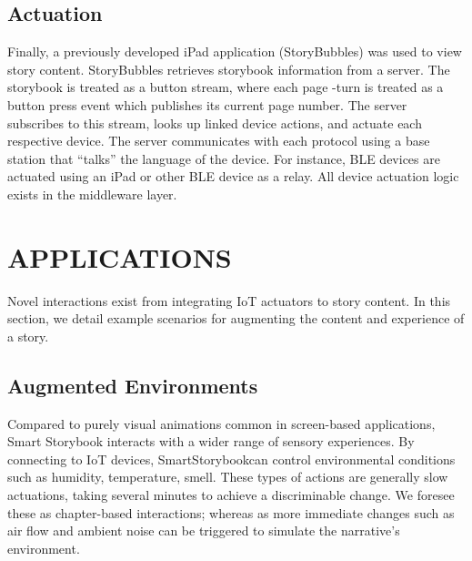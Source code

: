 \documentclass{sigchi}
\newcommand\name{SmartStorybook}
\begin{document}
\subsection{Actuation}
Finally, a previously developed iPad application (StoryBubbles) was used to view story content. StoryBubbles retrieves storybook information from a server. The storybook is treated as a button stream, where each page -turn is treated as a button press event which publishes its current page number. The server subscribes to this stream, looks up linked device actions, and actuate each respective device. 
The server communicates with each protocol using a base station that ``talks'' the language of the device. For instance, BLE devices are actuated using an iPad or other BLE device as a relay. All device actuation logic exists in the middleware layer. 



\section{APPLICATIONS}
Novel interactions exist from integrating IoT actuators to story content. In this section, we detail example scenarios for augmenting the content and experience of a story. 

\subsection{Augmented Environments}
Compared to purely visual animations common in screen-based applications, Smart Storybook interacts with a wider range of sensory experiences. By connecting to IoT devices, \name can control environmental conditions such as humidity, temperature, smell. These types of actions are generally slow actuations, taking several minutes to achieve a discriminable change. We foresee these as chapter-based interactions; whereas as more immediate changes such as air flow and ambient noise can be triggered to simulate the narrative's environment.
\end{document}
